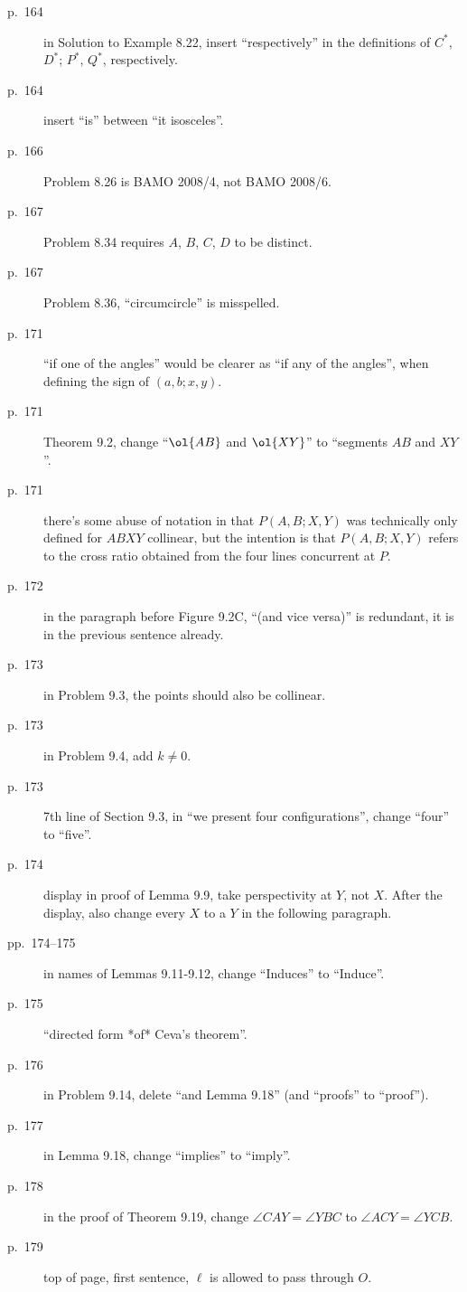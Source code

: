 \documentclass[11pt]{scrartcl}
\begin{document}
\begin{description}
\item[p.\  164] in Solution to Example 8.22, insert ``respectively''
  in the definitions of $C^\ast$, $D^\ast$; $P^\ast$, $Q^\ast$, respectively.
\item[p.\  164] insert ``is'' between ``it isosceles''.
\item[p.\  166] Problem 8.26 is BAMO 2008/4, not BAMO 2008/6.
\item[p.\  167] Problem 8.34 requires $A$, $B$, $C$, $D$ to be distinct.
\item[p.\  167] Problem 8.36, ``circumcircle'' is misspelled.
\item[p.\  171] ``if one of the angles'' would be clearer as ``if any of the
  angles'', when defining the sign of $(a,b;x,y)$.
\item[p.\  171] Theorem 9.2, change ``$\ol{AB}$ and $\ol{XY}$'' to ``segments $AB$ and $XY$''.
\item[p.\  171] there's some abuse of notation in that $P(A,B;X,Y)$
  was technically only defined for $ABXY$ collinear,
  but the intention is that $P(A,B;X,Y)$ refers to the cross ratio obtained
  from the four lines concurrent at $P$.
\item[p.\  172] in the paragraph before Figure 9.2C,
  ``(and vice versa)'' is redundant, it is in the previous sentence already.
\item[p.\  173] in Problem 9.3, the points should also be collinear.
\item[p.\  173] in Problem 9.4, add $k \neq 0$.
\item[p.\  173] 7th line of Section 9.3, in ``we present four configurations'',
  change ``four'' to ``five''.
\item[p.\  174] display in proof of Lemma 9.9, take perspectivity at $Y$, not $X$.
  After the display, also change every $X$ to a $Y$ in the following paragraph.
\item[pp.\  174--175] in names of Lemmas 9.11-9.12,
  change ``Induces'' to ``Induce''.
\item[p.\  175] ``directed form *of* Ceva's theorem''.
\item[p.\  176] in Problem 9.14, delete ``and Lemma 9.18'' (and ``proofs'' to ``proof'').
\item[p.\  177] in Lemma 9.18, change ``implies'' to ``imply''.
\item[p.\  178] in the proof of Theorem 9.19, change $\angle CAY = \angle YBC$ to $\angle ACY = \angle YCB$.
\item[p.\  179] top of page, first sentence, $\ell$ is allowed to pass through $O$.

\end{description}
\end{document}
